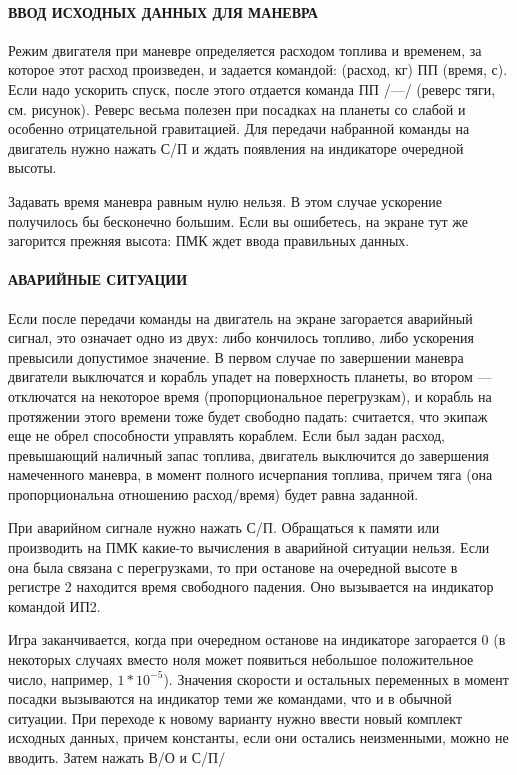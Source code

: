 \documentclass[11pt,a4paper,oneside]{article}
\begin{document}
\paragraph{ВВОД ИСХОДНЫХ ДАННЫХ ДЛЯ МАНЕВРА}

Режим двигателя при маневре определяется расходом топлива и временем, за которое этот расход произведен, и задается командой: (расход, кг) ПП (время, с). Если надо ускорить спуск, после этого отдается команда ПП /—/ (реверс тяги, см. рисунок). Реверс весьма полезен при посадках на планеты со слабой и особенно отрицательной гравитацией. Для передачи набранной команды на двигатель нужно нажать С/П и ждать появления на индикаторе очередной высоты.

Задавать время маневра равным нулю нельзя. В этом случае ускорение получилось бы бесконечно большим. Если вы ошибетесь, на экране тут же загорится прежняя высота: ПМК ждет ввода правильных данных.

\paragraph{АВАРИЙНЫЕ СИТУАЦИИ}

Если после передачи команды на двигатель на экране загорается аварийный сигнал, это означает одно из двух: либо кончилось топливо, либо ускорения превысили допустимое значение. В первом случае по завершении маневра двигатели выключатся и корабль упадет на поверхность планеты, во втором — отключатся на некоторое время (пропорциональное перегрузкам), и корабль на протяжении этого времени тоже будет свободно падать: считается, что экипаж еще не обрел способности управлять кораблем. Если был задан расход, превышающий наличный запас топлива, двигатель выключится до завершения намеченного маневра, в момент полного исчерпания топлива, причем тяга (она пропорциональна отношению расход/время) будет равна заданной.

При аварийном сигнале нужно нажать С/П. Обращаться к памяти или производить на ПМК какие-то вычисления в аварийной ситуации нельзя. Если она была связана с перегрузками, то при останове на очередной высоте в регистре 2 находится время свободного падения. Оно вызывается на индикатор командой ИП2.

Игра заканчивается, когда при очередном останове на индикаторе загорается 0 (в некоторых случаях вместо ноля может появиться небольшое положительное число, например, $1 * 10^{-5}$). Значения скорости и остальных переменных в момент посадки вызываются на индикатор теми же командами, что и в обычной ситуации. При переходе к новому варианту нужно ввести новый комплект исходных данных, причем константы, если они остались неизменными, можно не вводить. Затем нажать В/О и С/П/
\end{document}
